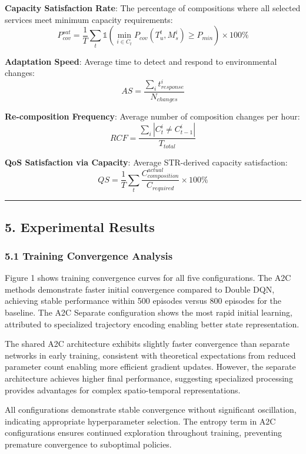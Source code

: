 \documentclass[
  10pt,
  twocolumn,
]{article}
\begin{document}
\textbf{Capacity Satisfaction Rate}: The percentage of compositions
where all selected services meet minimum capacity requirements:
\[P_{cov}^{sat} = \frac{1}{T}\sum_t \mathbb{1}\left(\min_{i \in C_t} P_{cov}(T_u^t, M_s^i) \geq P_{min}\right) \times 100\%\]

\textbf{Adaptation Speed}: Average time to detect and respond to
environmental changes:
\[AS = \frac{\sum_{i} t_{response}^i}{N_{changes}}\]

\textbf{Re-composition Frequency}: Average number of composition changes
per hour: \[RCF = \frac{\sum_{i} |C_t^i \neq C_{t-1}^i|}{T_{total}}\]

\textbf{QoS Satisfaction via Capacity}: Average STR-derived capacity
satisfaction:
\[QS = \frac{1}{T}\sum_{t} \frac{C_{composition}^{actual}}{C_{required}} \times 100\%\]

\begin{center}\rule{0.5\linewidth}{0.5pt}\end{center}

\hypertarget{experimental-results}{%
	\subsection{5. Experimental Results}\label{experimental-results}}

\hypertarget{training-convergence-analysis}{%
	\subsubsection{5.1 Training Convergence
		Analysis}\label{training-convergence-analysis}}

Figure 1 shows training convergence curves for all five configurations.
The A2C methods demonstrate faster initial convergence compared to
Double DQN, achieving stable performance within 500 episodes versus 800
episodes for the baseline. The A2C Separate configuration shows the most
rapid initial learning, attributed to specialized trajectory encoding
enabling better state representation.

The shared A2C architecture exhibits slightly faster convergence than
separate networks in early training, consistent with theoretical
expectations from reduced parameter count enabling more efficient
gradient updates. However, the separate architecture achieves higher
final performance, suggesting specialized processing provides advantages
for complex spatio-temporal representations.

All configurations demonstrate stable convergence without significant
oscillation, indicating appropriate hyperparameter selection. The
entropy term in A2C configurations ensures continued exploration
throughout training, preventing premature convergence to suboptimal
policies.
\end{document}
